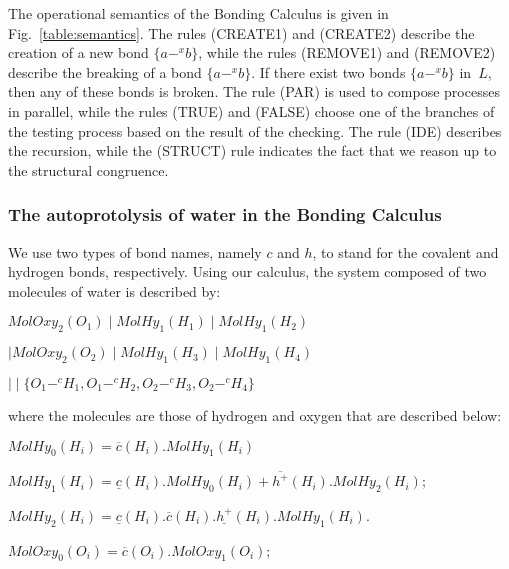 \documentclass[runningheads]{llncs}
\newcommand{\MolOxy}{\mathit{MolOxy}}
\newcommand{\MolHy}{\mathit{MolHy}}
\begin{document}
The operational semantics of the Bonding Calculus is given in Fig.~\ref{table:semantics}. The rules {\sf (CREATE1)} and {\sf (CREATE2)} describe the creation of a 
new bond $\{a-^x b\}$, while the rules {\sf (REMOVE1)} and {\sf (REMOVE2)} 
describe the breaking of a bond $\{a-^x b\}$. If there exist two bonds 
$\{a-^x b\}$ in~$L$, then any of these bonds is broken. The rule 
{\sf (PAR}) is used to compose processes in parallel, while the rules 
{\sf (TRUE}) and {\sf (FALSE}) choose one of the branches of the testing 
process based on the result of the checking. The rule {\sf (IDE)} describes 
the recursion, while the {\sf (STRUCT)} rule indicates the fact that we reason 
up to the structural congruence.


\subsubsection{The autoprotolysis of water in the Bonding Calculus}We use two types of bond names, namely $c$ and $h$, 
to stand for the covalent and hydrogen bonds, respectively. Using our  
calculus, the system composed of two molecules of water is described by:

\begin{center}
$MolOxy_2(O_1) \mid \MolHy_1(H_1) \mid \MolHy_1(H_2) $
\end{center}
\begin{center}
$\mid \MolOxy_2(O_2) \mid \MolHy_1(H_3) \mid \MolHy_1(H_4) $
\end{center}
\begin{center}
$\mid\mid \{O_1 -^c H_1, O_1 -^c H_2, O_2 -^c H_3, O_2 -^c H_4\}$
\end{center}


\noindent 
where the molecules are those of hydrogen and oxygen that are described below:
\vspace{1mm}

$\MolHy_0(H_i) = \overline{c}(H_i).\MolHy_1(H_i)$
\vspace{1mm}

$\MolHy_1(H_i) = \underline{c}(H_i).\MolHy_0(H_i) + \overline{h^+}(H_i).\MolHy_2(H_i)$;
\vspace{1mm}

$\MolHy_2(H_i) = \underline{c}(H_i).\overline{c}(H_i).\underline{h^+}(H_i).\MolHy_{1}(H_i)$.
\vspace{1mm}

$\MolOxy_0(O_i) = \overline{c}(O_i).\MolOxy_1(O_i)$;
\vspace{1mm}
\end{document}
